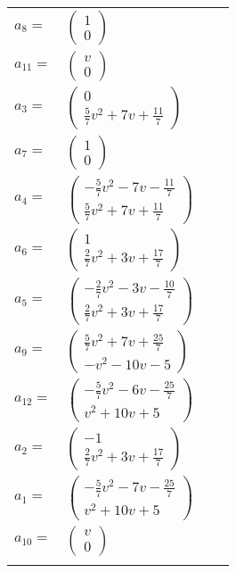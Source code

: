 \documentclass[1p]{elsarticle_modified}
\theoremstyle{definition}
\begin{document}
\begin{tabular}{m{7pt} m{180pt} m{7pt} m{180pt} }
\flushright $a_{8}=$&$\begin{pmatrix}1\\0\end{pmatrix}$ \\
\flushright $a_{11}=$&$\begin{pmatrix}v\\0\end{pmatrix}$ \\
\flushright $a_{3}=$&$\begin{pmatrix}0\\\frac{5}{7} v^2+7 v+\frac{11}{7}\end{pmatrix}$ \\
\flushright $a_{7}=$&$\begin{pmatrix}1\\0\end{pmatrix}$ \\
\flushright $a_{4}=$&$\begin{pmatrix}-\frac{5}{7} v^2-7 v-\frac{11}{7}\\\frac{5}{7} v^2+7 v+\frac{11}{7}\end{pmatrix}$ \\
\flushright $a_{6}=$&$\begin{pmatrix}1\\\frac{2}{7} v^2+3 v+\frac{17}{7}\end{pmatrix}$ \\
\flushright $a_{5}=$&$\begin{pmatrix}-\frac{2}{7} v^2-3 v-\frac{10}{7}\\\frac{2}{7} v^2+3 v+\frac{17}{7}\end{pmatrix}$ \\
\flushright $a_{9}=$&$\begin{pmatrix}\frac{5}{7} v^2+7 v+\frac{25}{7}\\- v^2-10 v-5\end{pmatrix}$ \\
\flushright $a_{12}=$&$\begin{pmatrix}-\frac{5}{7} v^2-6 v-\frac{25}{7}\\v^2+10 v+5\end{pmatrix}$ \\
\flushright $a_{2}=$&$\begin{pmatrix}-1\\\frac{2}{7} v^2+3 v+\frac{17}{7}\end{pmatrix}$ \\
\flushright $a_{1}=$&$\begin{pmatrix}-\frac{5}{7} v^2-7 v-\frac{25}{7}\\v^2+10 v+5\end{pmatrix}$ \\
\flushright $a_{10}=$&$\begin{pmatrix}v\\0\end{pmatrix}$\\&\end{tabular}
\end{document}
